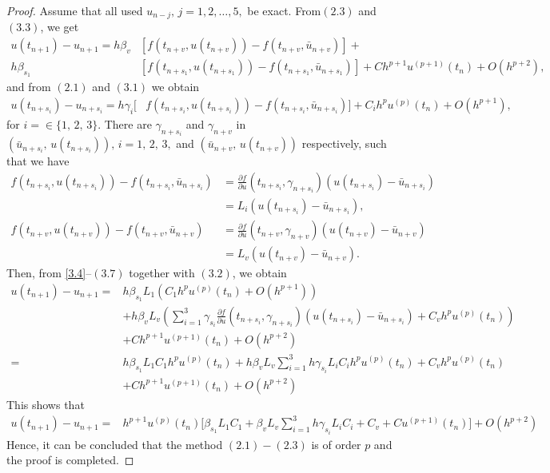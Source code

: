 \documentclass[11pt,twoside, final]{amsart}
\begin{document}
\begin{proof}
Assume that all used
 $u_{n-j},\,j=1,2,\ldots,5,$  be exact. From$(2.3)$ and $(3.3)$, we get
\begin{align}\label{3.4}
  u(t_{n+1}) -u_{n+1}=
  h\beta_{v}&[f(t_{n+ v},u(t_{n+v}))-f(t_{n+ v},\bar{u}_{n+v})]+\\
    h\beta_{s_{1}}&[f(t_{n+ s_{1}},u(t_{n+s_{1}}))
-f(t_{n+ s_{1}},\bar{u}_{n+s_{1}})]
+Ch^{p+1}u^{(p+1)}(t_{n})+O(h^{p+2}),\nonumber
\end{align}
and from $(2.1)$ and $(3.1)$ we
obtain
\begin{align}\label{3.5}
  u(t_{n+s_{i}}) -u_{n+s_{i}}=
  h\gamma _{i}[& f(t_{n+ s_{i}},u(t_{n+s_{i}}))
-f(t_{n+ s_{i}},\bar{u}_{n+s_{i}})]
+C_{i}h^{p}u^{(p)}(t_{n})+O(h^{p+1}),%
\end{align}
for $i=\in \{1,\,2,\,3\}.$ There are $\gamma_{n+s_{i}}$ and $\gamma_{n+v}$ in  $( \bar{u}_{n+s_{i}},\,u(t_{n+s_{i}} )),\,i=1,\,2,\,3,$  
and $( \bar{u}_{n+v},\,u(t_{n+v} ))$  respectively,
such that we have
\begin{align}
f(t_{n+s_{i}},u(t_{n+ s_{i}}))-f(t_{n+ s_{i}},\bar{u}_{n+s_{i}}) &=\frac{\partial f}{\partial u}(t_{n+s_{i}},\gamma_{n+s_{i}})
(u(t_{n+s_{i}})-\bar{u}_{n+s_{i}})\\
&=L_{i}(u(t_{n+s_{i}})-\bar{u}_{n+s_{i}}),\nonumber\\
 f(t_{n+v},u(t_{n+ v}))-f(t_{n+ v},\bar{u}_{n+v}) &=\frac{\partial f}{\partial u}(t_{n+v},\gamma_{n+v})
(u(t_{n+v})-\bar{u}_{n+v})\\
&=L_{v}(u(t_{n+v})-\bar{u}_{n+v}).\nonumber
\end{align}
Then, from \eqref{3.4}--$(3.7)$ together with  $(3.2)$, we obtain
\begin{align*}\label{}
  u(t_{n+1}) -u_{n+1}=&
  h\beta_{s_{1}}L_{1}(C_{1}h^{p}u^{(p)}(t_{n})+O(h^{p+1}))\\
 & +h\beta_{v}L_{v}(\sum_{i=1}^{3}\gamma_{s_{i}}\frac{\partial f}{\partial u}(t_{n+s_{i}},\gamma_{n+s_{i}})(u(t_{n+s_{i}})-\bar{u}_{n+s_{i}})+C_{v}h^{p}u^{(p)}(t_{n}))\\ 
  &+Ch^{p+1}u^{(p+1)}(t_{n})+O(h^{p+2})\\
=& h\beta_{s_{1}}L_{1}C_{1}h^{p}u^{(p)}(t_{n}) +h\beta_{v}L_{v}\sum_{i=1}^{3}h\gamma_{s_{i}}L_{i}C_{i}h^{p}u^{(p)}(t_{n})+C_{v}h^{p}u^{(p)}(t_{n})\\ 
  &+Ch^{p+1}u^{(p+1)}(t_{n})+O(h^{p+2})  
\end{align*}
This shows that
\begin{align*}\label{}
  u(t_{n+1}) -u_{n+1}=& h^{p+1}u^{(p)}(t_{n})\bigg[\beta_{s_{1}}L_{1}C_{1} +\beta_{v}L_{v}\sum_{i=1}^{3}h\gamma_{s_{i}}L_{i}C_{i}+C_{v} 
 +Cu^{(p+1)}(t_{n})\bigg]+O(h^{p+2}) 
\end{align*}
Hence, it can be concluded  that the method $(2.1)-(2.3)$ is of order $p$ and the proof is  completed.
\end{proof}
\end{document}
